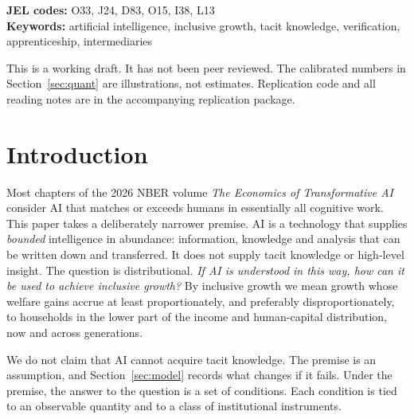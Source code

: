 \documentclass[12pt]{article}
\theoremstyle{remark}
\begin{document}
\begin{titlepage}
\noindent\textbf{JEL codes:} O33, J24, D83, O15, I38, L13\\
\textbf{Keywords:} artificial intelligence, inclusive growth, tacit knowledge, verification, apprenticeship, intermediaries

\vfill
\noindent\small This is a working draft. It has not been peer reviewed. The calibrated numbers in Section~\ref{sec:quant} are illustrations, not estimates. Replication code and all reading notes are in the accompanying replication package.
\end{titlepage}

\section{Introduction}\label{sec:intro}

Most chapters of the 2026 NBER volume \emph{The Economics of Transformative AI} \citep{agrawal2026volume} consider AI that matches or exceeds humans in essentially all cognitive work. This paper takes a deliberately narrower premise. AI is a technology that supplies \emph{bounded} intelligence in abundance: information, knowledge and analysis that can be written down and transferred. It does not supply tacit knowledge or high-level insight. The question is distributional. \emph{If AI is understood in this way, how can it be used to achieve inclusive growth?} By inclusive growth we mean growth whose welfare gains accrue at least proportionately, and preferably disproportionately, to households in the lower part of the income and human-capital distribution, now and across generations.

We do not claim that AI cannot acquire tacit knowledge. The premise is an assumption, and Section~\ref{sec:model} records what changes if it fails. Under the premise, the answer to the question is a set of conditions. Each condition is tied to an observable quantity and to a class of institutional instruments.
\end{document}
